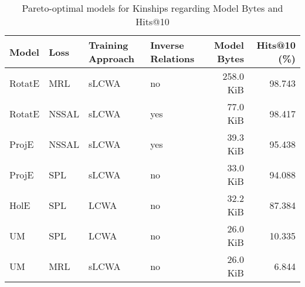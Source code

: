 \begin{table}[H]
\centering
\caption{Pareto-optimal models for Kinships regarding Model Bytes and Hits@10}
\label{tab:skyline_kinships_model_bytes}
\begin{tabular}{llllrr}
\toprule
  Model &   Loss & Training Approach & Inverse Relations & Model Bytes &  Hits@10 (\%) \\
\midrule
 RotatE &    MRL &             sLCWA &                no &   258.0 KiB &       98.743 \\
 RotatE &  NSSAL &             sLCWA &               yes &    77.0 KiB &       98.417 \\
  ProjE &  NSSAL &             sLCWA &               yes &    39.3 KiB &       95.438 \\
  ProjE &    SPL &             sLCWA &                no &    33.0 KiB &       94.088 \\
   HolE &    SPL &              LCWA &                no &    32.2 KiB &       87.384 \\
     UM &    SPL &              LCWA &                no &    26.0 KiB &       10.335 \\
     UM &    MRL &             sLCWA &                no &    26.0 KiB &        6.844 \\
\bottomrule
\end{tabular}
\end{table}

